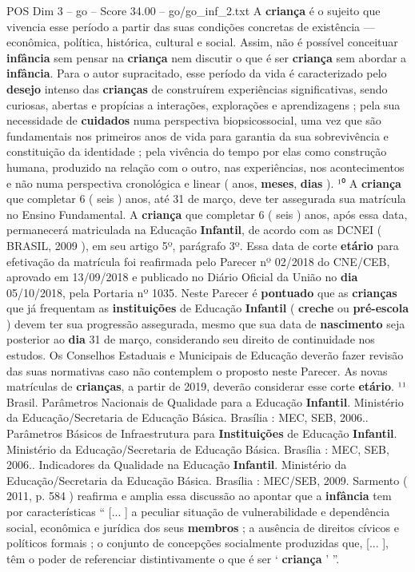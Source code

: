 \begin{textsample}{POS Dim 3 – go – Score 34.00 – go/go\_inf\_2.txt}
A \textbf{criança} é o sujeito que vivencia esse período a partir das suas condições concretas de existência — econômica, política, histórica, cultural e social.
Assim, não é possível conceituar \textbf{infância} sem pensar na \textbf{criança} nem discutir o que é ser \textbf{criança} sem abordar a \textbf{infância}.
Para o autor supracitado, esse período da vida é caracterizado pelo \textbf{desejo} intenso das \textbf{crianças} de construírem experiências significativas, sendo curiosas, abertas e propícias a interações, explorações e aprendizagens ; pela sua necessidade de \textbf{cuidados} numa perspectiva biopsicossocial, uma vez que são fundamentais nos primeiros anos de vida para garantia da sua sobrevivência e constituição da identidade ; pela vivência do tempo por elas como construção humana, produzido na relação com o outro, nas experiências, nos acontecimentos e não numa perspectiva cronológica e linear ( anos, \textbf{meses}, \textbf{dias} ). ¹⁰ A \textbf{criança} que completar 6 ( seis ) anos, até 31 de março, deve ter assegurada sua matrícula no Ensino Fundamental.
A \textbf{criança} que completar 6 ( seis ) anos, após essa data, permanecerá matriculada na Educação \textbf{Infantil}, de acordo com as DCNEI ( BRASIL, 2009 ), em seu artigo 5º, parágrafo 3º.
Essa data de corte \textbf{etário} para efetivação da matrícula foi reafirmada pelo Parecer nº 02/2018 do CNE/CEB, aprovado em 13/09/2018 e publicado no Diário Oficial da União no \textbf{dia} 05/10/2018, pela Portaria nº 1035.
Neste Parecer é \textbf{pontuado} que as \textbf{crianças} que já frequentam as \textbf{instituições} de Educação \textbf{Infantil} ( \textbf{creche} ou \textbf{pré-escola} ) devem ter sua progressão assegurada, mesmo que sua data de \textbf{nascimento} seja posterior ao \textbf{dia} 31 de março, considerando seu direito de continuidade nos estudos.
Os Conselhos Estaduais e Municipais de Educação deverão fazer revisão das suas normativas caso não contemplem o proposto neste Parecer.
As novas matrículas de \textbf{crianças}, a partir de 2019, deverão considerar esse corte \textbf{etário}. ¹¹ Brasil.
Parâmetros Nacionais de Qualidade para a Educação \textbf{Infantil}.
Ministério da Educação/Secretaria de Educação Básica.
Brasília : MEC, SEB, 2006..
Parâmetros Básicos de Infraestrutura para \textbf{Instituições} de Educação \textbf{Infantil}.
Ministério da Educação/Secretaria de Educação Básica.
Brasília : MEC, SEB, 2006..
Indicadores da Qualidade na Educação \textbf{Infantil}.
Ministério da Educação/Secretaria da Educação Básica.
Brasília : MEC/SEB, 2009.
Sarmento ( 2011, p. 584 ) reafirma e amplia essa discussão ao apontar que a \textbf{infância} tem por características “ [... ] a peculiar situação de vulnerabilidade e dependência social, econômica e jurídica dos seus \textbf{membros} ; a ausência de direitos cívicos e políticos formais ; o conjunto de concepções socialmente produzidas que, [... ], têm o poder de referenciar distintivamente o que é ser ‘ \textbf{criança} ’ ”.

\end{textsample}
